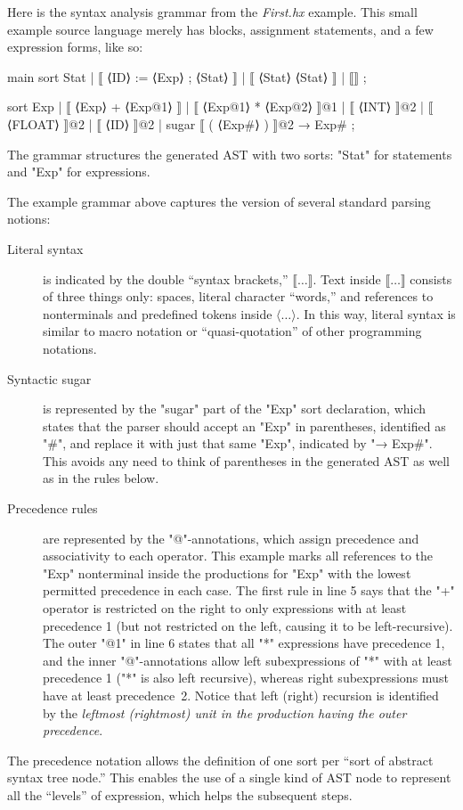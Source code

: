 \documentclass[11pt]{article} %
\begin{document}
\begin{example}\label{ex:syntax}
  Here is the syntax analysis grammar from the \emph{First.hx} example. This small example source
  language merely has blocks, assignment statements, and a few expression forms, like so:
  \begin{hacs}[xleftmargin=\parindent,xrightmargin=2em,numbers=right]
main sort Stat  | ⟦ ⟨ID⟩ := ⟨Exp⟩ ; ⟨Stat⟩ ⟧
                | ⟦ { ⟨Stat⟩ } ⟨Stat⟩ ⟧
                | ⟦⟧ ;

sort Exp  | ⟦ ⟨Exp⟩ + ⟨Exp@1⟩ ⟧
           | ⟦ ⟨Exp@1⟩ * ⟨Exp@2⟩ ⟧@1
           | ⟦ ⟨INT⟩ ⟧@2
           | ⟦ ⟨FLOAT⟩ ⟧@2
           | ⟦ ⟨ID⟩ ⟧@2
           | sugar ⟦ ( ⟨Exp#⟩ ) ⟧@2 → Exp# ;
  \end{hacs}
  The grammar structures the generated AST with two sorts: "Stat" for statements and "Exp" for
  expressions.
\end{example}

The example grammar above captures the \HAX version of several standard parsing notions:
\begin{description}

\item[Literal syntax] is indicated by the double ``syntax brackets,'' $⟦…⟧$. Text inside $⟦…⟧$
  consists of three things only: spaces, literal character ``words,'' and references to
  nonterminals and predefined tokens inside $⟨…⟩$.  In this way, literal syntax is similar to macro
  notation or ``quasi-quotation'' of other programming notations.

\item[Syntactic sugar] is represented by the "sugar" part of the "Exp" sort declaration, which
  states that the parser should accept an "Exp" in parentheses, identified as "#", and replace it
  with just that same "Exp", indicated by "→ Exp#".  This avoids any need to think of parentheses in
  the generated AST as well as in the rules below.

\item[Precedence rules] are represented by the "@"-annotations, which assign precedence and
  associativity to each operator. This example marks all references to the "Exp" nonterminal inside
  the productions for "Exp" with the lowest permitted precedence in each case. The first rule in
  line 5 says that the "+" operator is restricted on the right to only expressions with at least
  precedence 1 (but not restricted on the left, causing it to be left-recursive). The outer "@1" in
  line 6 states that all "*" expressions have precedence 1, and the inner "@"-annotations allow left
  subexpressions of "*" with at least precedence 1 ("*" is also left recursive), whereas right
  subexpressions must have at least precedence~2. Notice that left (right) recursion is identified
  by the \emph{leftmost (rightmost) unit in the production having the outer precedence}.

\end{description}
The precedence notation allows the definition of one sort per ``sort of abstract syntax tree node.''
This enables the use of a single kind of AST node to represent all the ``levels'' of expression,
which helps the subsequent steps.
\end{document}
